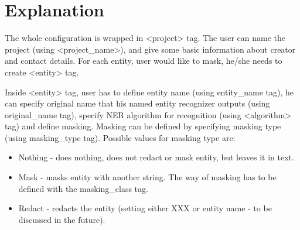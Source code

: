 \documentclass[letterpaper,10pt,english]{sphinxmanual}
\begin{document}
\begin{sphinxVerbatim}[commandchars=\\\{\}]
\end{sphinxVerbatim}


\section{Explanation}
\label{\detokenize{index:explanation}}
The whole configuration is wrapped in \textless{}project\textgreater{} tag. The user can name the project (using \textless{}project\_name\textgreater{}), and give some basic information about creator and contact details. For each entity, user would like to mask, he/she needs to create \textless{}entity\textgreater{} tag.

Inside \textless{}entity\textgreater{} tag, user has to define entity name (using entity\_name tag), he can specify original name that his named entity recognizer outputs (using original\_name tag), specify NER algorithm for recognition (using \textless{}algorithm\textgreater{} tag) and define masking. Masking can be defined by specifying masking type (using masking\_type tag). Possible values for masking type are:
\begin{itemize}
\item {} 
Nothing - does nothing, does not redact or mask entity, but leaves it in text.

\item {} 
Mask - masks entity with another string. The way of masking has to be defined with the masking\_class tag.

\item {} 
Redact - redacts the entity (setting either XXX or entity name - to be discussed in the future).

\end{itemize}
\end{document}
